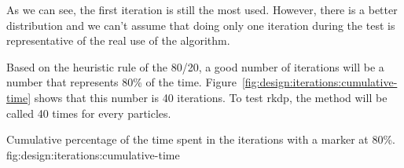 As we can see, the first iteration is still the most used.
However, there is a better distribution and we can't assume that doing only one
iteration during the test is representative of the real use of the algorithm.

Based on the heuristic rule of the 80/20, a good number of iterations
will be a number that represents 80\% of the time.
Figure~\ref{fig:design:iterations:cumulative-time} shows that this number
is 40 iterations.
To test \acrshort{rkdp}, the method will be called 40 times for every particles.

        {Cumulative percentage of the time spent in the iterations with a marker
        at 80\%.}
        {fig:design:iterations:cumulative-time}